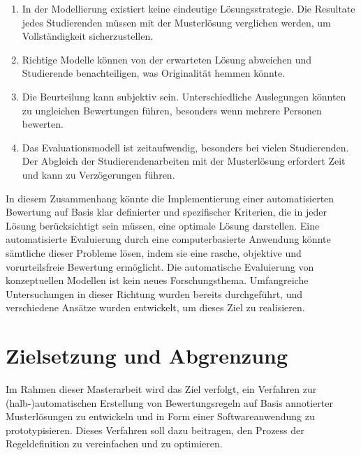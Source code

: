 \begin{enumerate}
    \item In der Modellierung existiert keine eindeutige Lösungsstrategie. Die Resultate jedes Studierenden müssen mit
    der Musterlösung verglichen werden, um Vollständigkeit sicherzustellen.

    \item Richtige Modelle können von der erwarteten Lösung abweichen und Studierende benachteiligen, was Originalität
    hemmen könnte.

    \item Die Beurteilung kann subjektiv sein. Unterschiedliche Auslegungen könnten zu ungleichen Bewertungen führen,
    besonders wenn mehrere Personen bewerten.

    \item Das Evaluationsmodell ist zeitaufwendig, besonders bei vielen Studierenden. Der Abgleich der Studierendenarbeiten
    mit der Musterlösung erfordert Zeit und kann zu Verzögerungen führen.

\end{enumerate}
    

In diesem Zusammenhang könnte die Implementierung einer automatisierten Bewertung auf Basis klar definierter und spezifischer Kriterien, die in jeder Lösung berücksichtigt sein müssen, eine optimale Lösung darstellen. Eine automatisierte Evaluierung durch eine computerbasierte Anwendung könnte sämtliche dieser Probleme lösen, indem sie eine rasche, objektive und vorurteilsfreie Bewertung ermöglicht. Die automatische Evaluierung von \gls{konzeptuellen Modellen} ist kein neues Forschungsthema. Umfangreiche Untersuchungen in dieser Richtung wurden bereits durchgeführt, und verschiedene Ansätze wurden entwickelt, um dieses Ziel zu realisieren.

\section{Zielsetzung und Abgrenzung}

Im Rahmen dieser Masterarbeit wird das Ziel verfolgt, ein Verfahren zur (halb-)automatischen Erstellung von Bewertungsregeln auf Basis annotierter Musterlösungen zu entwickeln und in Form einer Softwareanwendung zu prototypisieren. Dieses Verfahren soll dazu beitragen, den Prozess der Regeldefinition zu vereinfachen und zu optimieren.

